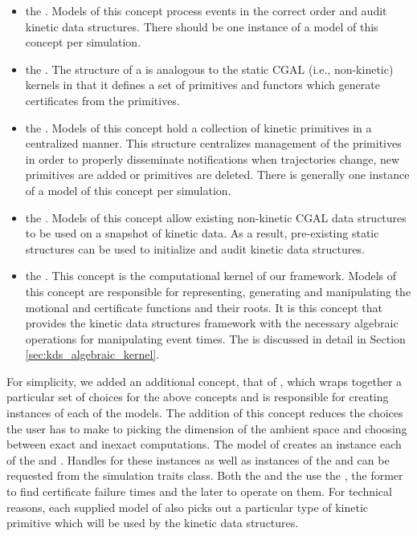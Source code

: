 \begin{itemize}

\item the . Models of this concept process events in
  the correct order and audit kinetic data structures. There should be
  one instance of a model of this concept per simulation.
\item the . The structure of a
   is analogous to the static CGAL (i.e.,
  non-kinetic) kernels in that it defines a set of primitives and
  functors which generate certificates from the primitives.
\item the . Models of this concept hold a
  collection of kinetic primitives in a centralized manner. This
  structure centralizes management of the primitives in order to
  properly disseminate notifications when trajectories change, new
  primitives are added or primitives are deleted.
  There is generally one instance of a model of this concept per simulation.
\item the . Models of this concept allow
  existing non-kinetic CGAL data structures to be used on a snapshot
  of kinetic data. As a result, pre-existing static structures can be
  used to initialize and audit kinetic data structures.
\item the . This concept is the computational
  kernel of our framework.  Models of this concept are responsible for
  representing, generating and manipulating the motional and
  certificate functions and their roots. It is this concept that
  provides the kinetic data structures framework with the necessary
  algebraic operations for manipulating event times. The
   is discussed in detail in Section
  \ref{sec:kds_algebraic_kernel}.
\end{itemize}

For simplicity, we added an additional concept, that of
, which wraps together a particular set of
choices for the above concepts and is responsible for creating
instances of each of the models. The addition of this concept reduces
the choices the user has to make to picking the dimension of the
ambient space and choosing between exact and inexact computations. The
model of  creates an instance each of the
 and . Handles for
these instances as well as instances of the 
and  can be requested from the simulation
traits class. Both the  and the
 use the , the former to find
certificate failure times and the later to operate on them. For
technical reasons, each supplied model of  also
picks out a particular type of kinetic primitive which will be used by
the kinetic data structures.



